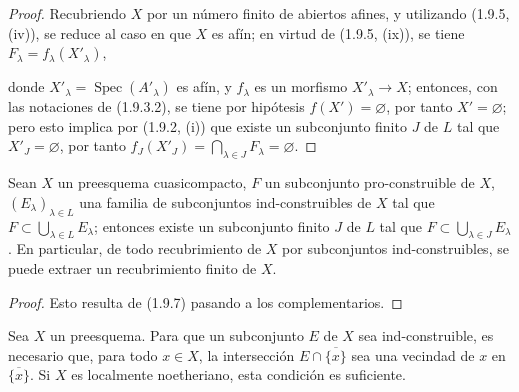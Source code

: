 \begin{proof}
Recubriendo $X$ por un número finito de abiertos afines, y utilizando (1.9.5,
(iv)), se reduce al caso en que $X$ es afín; en virtud de (1.9.5, (ix)), se
tiene $F_\lambda=f_\lambda(X'_\lambda)$,


donde $X'_\lambda=\operatorname{Spec}(A'_\lambda)$ es afín, y $f_\lambda$
es un morfismo $X'_\lambda\to X$; entonces, con las notaciones de (1.9.3.2),
se tiene por hipótesis $f(X')=\varnothing$, por tanto $X'=\varnothing$; pero esto
implica por (1.9.2, (i)) que existe un subconjunto finito $J$ de $L$ tal que
$X'_J=\varnothing$, por tanto
$f_J(X'_J)=\bigcap_{\lambda\in J}F_\lambda=\varnothing$.
\end{proof}

\begin{corollary}[1.9.9]
\label{IV.1.9.9-fr}
Sean $X$ un preesquema cuasicompacto, $F$ un subconjunto pro-construible de
$X$, $(E_\lambda)_{\lambda\in L}$ una familia de subconjuntos ind-construibles
de $X$ tal que $F\subset\bigcup_{\lambda\in L}E_\lambda$; entonces existe
un subconjunto finito $J$ de $L$ tal que
$F\subset\bigcup_{\lambda\in J}E_\lambda$. En particular, de todo
recubrimiento de $X$ por subconjuntos ind-construibles, se puede extraer un
recubrimiento finito de $X$.
\end{corollary}

\begin{proof}
Esto resulta de (1.9.7) pasando a los complementarios.
\end{proof}

\begin{proposition}[1.9.10]
\label{IV.1.9.10-fr}
Sea $X$ un preesquema. Para que un subconjunto $E$ de $X$ sea
ind-construible, es necesario que, para todo $x\in X$, la intersección
$E\cap\overline{\{x\}}$ sea una vecindad de $x$ en
$\overline{\{x\}}$. Si $X$ es localmente noetheriano, esta condición es
suficiente.
\end{proposition}

